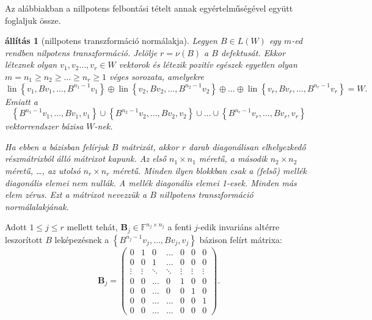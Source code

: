 \documentclass[9pt, a4paper, showtrims]{memoir}
\theoremstyle{plain}
\newtheorem{proposition}{állítás}[chapter]
\theoremstyle{remark}
\theoremstyle{definition}
\DeclareMathOperator{\lin}{lin}
\begin{document}
Az alábbiakban a nillpotens felbontási tételt annak egyértelműségével együtt foglaljuk össze.
\begin{proposition}[nillpotens transzformáció normálakja]\label{pr:nillpnormal}
    Legyen $B\in L\left( W \right)$ egy $m$-ed rendben nilpotens transzformáció.
    Jelölje $r=\nu\left( B \right)$ a $B$ defektusát.
    Ekkor léteznek olyan $v_1,v_2\dots,v_r\in W$ vektorok és 
    létezik pozitív egészek egyetlen olyan $m=n_1\geq n_2\geq \dots\geq n_r\geq 1$ véges sorozata,
    amelyekre
    \[
        \lin\left\{ v_1,Bv_1,\dots,B^{n_1-1}v_1 \right\}
        \oplus
        \lin\left\{ v_2,Bv_2,\dots,B^{n_2-1}v_2 \right\}
        \oplus
        \ldots
        \oplus
        \lin\left\{ v_r,Bv_r,\dots,B^{n_r-1}v_r \right\}
        =
        W.
    \]
    Emiatt a
    \[
        \left\{ B^{n_1-1}v_1,\dots,Bv_1,v_1 \right\}
        \cup
        \left\{ B^{n_2-1}v_2,\dots,Bv_2,v_2 \right\}
        \cup
        \ldots
        \cup
        \left\{ B^{n_r-1}v_r,\dots,Bv_r,v_r \right\}
        \tag{\dag}
    \]
    vektorrendszer bázisa $W$-nek.

    Ha ebben a bázisban felírjuk $B$ mátrixát, 
    akkor $r$ darab diagonálisan elhelyezkedő részmátrixból álló mátrixot kapunk. 
    Az első $n_1\times n_1$ méretű, 
    a második $n_2\times n_2$ méretű, \dots, az utolsó $n_r\times n_r$ méretű.
    Minden ilyen blokkban csak a (felső) mellék diagonális elemei nem nullák.
    A mellék diagonális elemei 1-esek.
    Minden más elem zérus.
    Ezt a mátrixot nevezzük a $B$ nillpotens transzformáció \emph{normálalakjának}.
\end{proposition}
Adott $1\leq j\leq r$ mellett tehát, $\mathbf{B}_j\in \mathbb{F}^{n_j\times n_j}$
a fenti $j$-edik invariáns altérre leszorított $B$ leképezésnek a 
\begin{math}
    \left\{ B^{n_j-1}v_j,\dots,Bv_j,v_j \right\}
\end{math}
bázison felírt mátrixa:
\[
    \mathbf{B}_j
    =
    \begin{pmatrix}
        0&1&0&\dots& 0 &0&0\\
        0&0&1&\dots& 0 &0&0\\
        \vdots&\vdots&\ddots&\ddots&\vdots&\vdots&\vdots\\
        0&0&\dots&0& 1 &0&0\\
        0&0&\dots&0& 0 &1&0\\
        0&0&\dots&\dots& 0 &0&1\\
        0&0&\dots&\dots& 0 &0&0
    \end{pmatrix}.
\]
\end{document}
